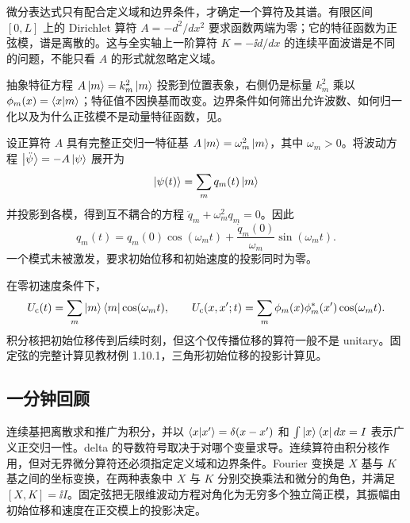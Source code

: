 
微分表达式只有配合定义域和边界条件，才确定一个算符及其谱。有限区间 $[0,L]$ 上的 Dirichlet 算符 $A=-d^2/dx^2$ 要求函数两端为零；它的特征函数为正弦模，谱是离散的。这与全实轴上一阶算符 $K=-\ii d/dx$ 的连续平面波谱是不同的问题，不能只看 $A$ 的形式就忽略定义域。

抽象特征方程 $A\left|m\right\rangle=k_m^2\left|m\right\rangle$ 投影到位置表象，右侧仍是标量 $k_m^2$ 乘以 $\phi_m(x)=\left\langle x \middle| m \right\rangle$；特征值不因换基而改变。边界条件如何筛出允许波数、如何归一化以及为什么正弦模不是动量特征函数，见。


设正算符 $A$ 具有完整正交归一特征基 $A\left|m\right\rangle=\omega_m^2\left|m\right\rangle$，其中 $\omega_m>0$。将波动方程 $\left|\ddot\psi\right\rangle=-A\left|\psi\right\rangle$ 展开为
\[
  \left|\psi(t)\right\rangle=\sum_m q_m(t)\left|m\right\rangle
\]
并投影到各模，得到互不耦合的方程 $\ddot q_m+\omega_m^2q_m=0$。因此
\[
  q_m(t)=q_m(0)\cos(\omega_mt)
  +\frac{\dot q_m(0)}{\omega_m}\sin(\omega_mt).
\]
一个模式未被激发，要求初始位移和初始速度的投影同时为零。

在零初速度条件下，
\[
  U_{\mathrm c}(t)=\sum_m\left|m\right\rangle\left\langle m\right|\cos(\omega_mt),
  \qquad
  U_{\mathrm c}(x,x';t)
  =\sum_m\phi_m(x)\phi_m^*(x')\cos(\omega_mt).
\]
积分核把初始位移传到后续时刻，但这个仅传播位移的算符一般不是 unitary。固定弦的完整计算见教材例 1.10.1，三角形初始位移的投影计算见。

\subsection{一分钟回顾}

连续基把离散求和推广为积分，并以 $\left\langle x \middle| x' \right\rangle=\delta(x-x')$ 和 $\int\left|x\right\rangle\left\langle x\right|dx=I$ 表示广义正交归一性。delta 的导数符号取决于对哪个变量求导。连续算符由积分核作用，但对无界微分算符还必须指定定义域和边界条件。Fourier 变换是 $X$ 基与 $K$ 基之间的坐标变换，在两种表象中 $X$ 与 $K$ 分别交换乘法和微分的角色，并满足 $[X,K]=\ii I$。固定弦把无限维波动方程对角化为无穷多个独立简正模，其振幅由初始位移和速度在正交模上的投影决定。
